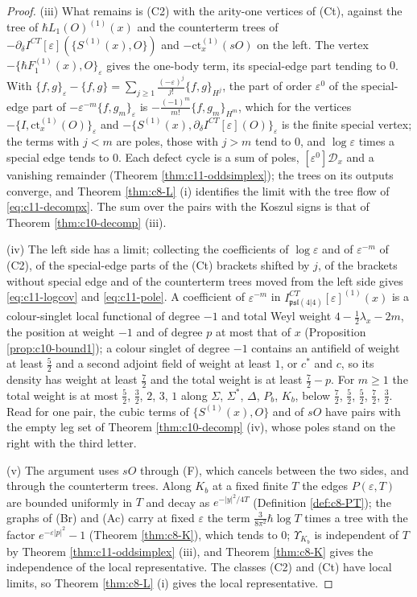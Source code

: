 \begin{proof}
(iii) What remains is (C2) with the arity-one vertices of (Ct), against the tree of $\hbar L_1(O)^{(1)}(x)$ and the counterterm trees of $-\partial_\delta I^{CT}[\varepsilon](\{S^{(1)}(x),O\})$ and $-\mathrm{ct}^{(1)}_x(sO)$ on the left. The vertex $-\{\hbar F_1^{(1)}(x),O\}_\varepsilon$ gives the one-body term, its special-edge part tending to $0$. With $\{f,g\}_\varepsilon-\{f,g\}=\sum_{j\ge1}\frac{(-\varepsilon)^j}{j!}\{f,g\}_{H^j}$, the part of order $\varepsilon^0$ of the special-edge part of $-\varepsilon^{-m}\{f,g_m\}_\varepsilon$ is $-\frac{(-1)^m}{m!}\{f,g_m\}_{H^m}$, which for the vertices $-\{I,\mathrm{ct}^{(1)}_x(O)\}_\varepsilon$ and $-\{S^{(1)}(x),\partial_\delta I^{CT}[\varepsilon](O)\}_\varepsilon$ is the finite special vertex; the terms with $j<m$ are poles, those with $j>m$ tend to $0$, and $\log\varepsilon$ times a special edge tends to $0$. Each defect cycle is a sum of poles, $[\varepsilon^0]\mathcal D_x$ and a vanishing remainder (Theorem \ref{thm:c11-oddsimplex}); the trees on its outputs converge, and Theorem \ref{thm:c8-L} (i) identifies the limit with the tree flow of \eqref{eq:c11-decompx}. The sum over the pairs with the Koszul signs is that of Theorem \ref{thm:c10-decomp} (iii).

(iv) The left side has a limit; collecting the coefficients of $\log\varepsilon$ and of $\varepsilon^{-m}$ of (C2), of the special-edge parts of the (Ct) brackets shifted by $j$, of the brackets without special edge and of the counterterm trees moved from the left side gives \eqref{eq:c11-logcov} and \eqref{eq:c11-pole}. A coefficient of $\varepsilon^{-m}$ in $I^{CT}_{\mathfrak{psl}(4|4)}[\varepsilon]^{(1)}(x)$ is a colour-singlet local functional of degree $-1$ and total Weyl weight $4-\tfrac12\lambda_x-2m$, the position at weight $-1$ and of degree $p$ at most that of $x$ (Proposition \ref{prop:c10-bound1}); a colour singlet of degree $-1$ contains an antifield of weight at least $\tfrac52$ and a second adjoint field of weight at least $1$, or $c^*$ and $c$, so its density has weight at least $\tfrac72$ and the total weight is at least $\tfrac72-p$. For $m\ge1$ the total weight is at most $\tfrac52$, $\tfrac32$, $2$, $3$, $1$ along $\Sigma$, $\Sigma^*$, $\Delta$, $P_b$, $K_b$, below $\tfrac72$, $\tfrac52$, $\tfrac52$, $\tfrac72$, $\tfrac32$. Read for one pair, the cubic terms of $\{S^{(1)}(x),O\}$ and of $sO$ have pairs with the empty leg set of Theorem \ref{thm:c10-decomp} (iv), whose poles stand on the right with the third letter.

(v) The argument uses $sO$ through (F), which cancels between the two sides, and through the counterterm trees. Along $K_b$ at a fixed finite $T$ the edges $P(\varepsilon,T)$ are bounded uniformly in $T$ and decay as $e^{-|y|^2/4T}$ (Definition \ref{def:c8-PT}); the graphs of (Br) and (Ac) carry at fixed $\varepsilon$ the term $\tfrac{3}{8\pi^2}\hbar\log T$ times a tree with the factor $e^{-\varepsilon|p|^2}-1$ (Theorem \ref{thm:c8-K}), which tends to $0$; $\Upsilon_{K_b}$ is independent of $T$ by Theorem \ref{thm:c11-oddsimplex} (iii), and Theorem \ref{thm:c8-K} gives the independence of the local representative. The classes (C2) and (Ct) have local limits, so Theorem \ref{thm:c8-L} (i) gives the local representative.
\end{proof}

